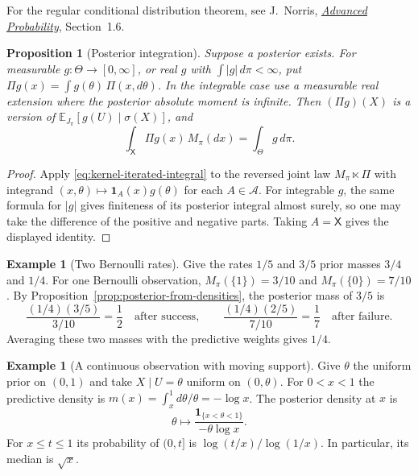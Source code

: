 \documentclass[11pt,oneside]{book}
\newtheorem{proposition}[theorem]{Proposition}
\theoremstyle{definition}
\newtheorem{example}[theorem]{Example}
\theoremstyle{remark}
\begin{document}
For the regular conditional distribution theorem, see J.~Norris,
\href{https://www.statslab.cam.ac.uk/~jrn10/Lectures/ap.pdf}{\emph{Advanced
Probability}}, Section~1.6.

\begin{proposition}[Posterior integration]
\label{prop:bayesian-posterior-integration}
Suppose a posterior exists. For measurable $g:\Theta\to[0,\infty]$,
or real $g$ with $\int |g|\,d\pi<\infty$, put
$\Pi g(x)=\int g(\theta)\,\Pi(x,d\theta)$. In the integrable case use
a measurable real extension where the posterior absolute moment is
infinite.
Then $(\Pi g)(X)$ is a version of $\mathbb E_{J_\pi}[g(U)\mid\sigma(X)]$,
and
\[
\int_{\mathsf X}\Pi g(x)\,M_\pi(dx)=\int_\Theta g\,d\pi .
\]
\end{proposition}
\begin{proof}
Apply \eqref{eq:kernel-iterated-integral} to the reversed joint law
$M_\pi\ltimes\Pi$ with integrand $(x,\theta)\mapsto\mathbf 1_A(x)g(\theta)$
for each $A\in\mathcal A$. For integrable $g$, the same formula for
$|g|$ gives finiteness of its posterior integral almost surely, so one
may take the difference of the positive and negative parts. Taking
$A=\mathsf X$ gives the displayed identity.
\end{proof}

\begin{example}[Two Bernoulli rates]
\label{ex:bayesian-unequal-bernoulli-rates}
Give the rates $1/5$ and $3/5$ prior masses $3/4$ and $1/4$.
For one Bernoulli observation, $M_\pi(\{1\})=3/10$ and
$M_\pi(\{0\})=7/10$. By Proposition~\ref{prop:posterior-from-densities},
the posterior mass of $3/5$ is
\[
\frac{(1/4)(3/5)}{3/10}=\frac12\quad\text{after success},\qquad
\frac{(1/4)(2/5)}{7/10}=\frac17\quad\text{after failure}.
\]
Averaging these two masses with the predictive weights gives $1/4$.
\end{example}

\begin{example}[A continuous observation with moving support]
\label{ex:bayesian-uniform-endpoint-posterior}
Give $\theta$ the uniform prior on $(0,1)$ and take
$X\mid U=\theta$ uniform on $(0,\theta)$. For $0<x<1$ the
predictive density is $m(x)=\int_x^1 d\theta/\theta=-\log x$.
The posterior density at $x$ is
\[
\theta\longmapsto \frac{\mathbf 1_{\{x<\theta<1\}}}{-\theta\log x}.
\]
For $x\leq t\leq1$ its probability of $(0,t]$ is
$\log(t/x)/\log(1/x)$. In particular, its median is $\sqrt{x}$.
\end{example}
\end{document}
